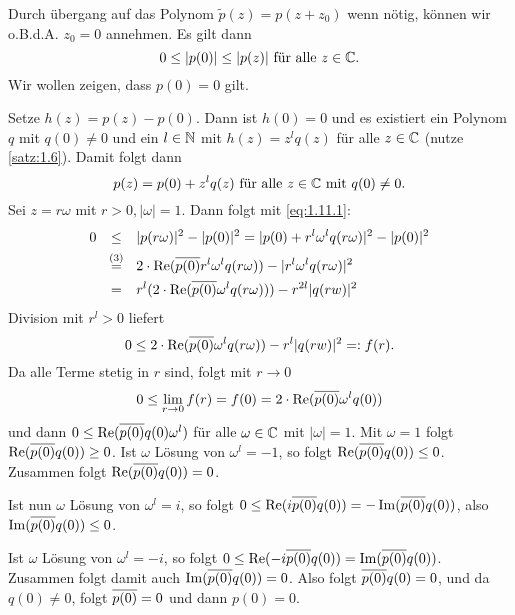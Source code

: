 \begin{beweis}
	Durch übergang auf das Polynom $\tilde{p}(z) = p(z+z_0)$ wenn nötig, können wir o.B.d.A. $z_0 = 0$ annehmen.
	Es gilt dann
	\begin{equation}
		0 \leq |p(0)| \leq |p(z)| \text{ für alle } z \in \mathbb{C}. \label{eq:1.11.1}
	\end{equation}
	Wir wollen zeigen, dass $p(0) = 0$ gilt.
	
	Setze $h(z) = p(z) - p(0)$.
	Dann ist $h(0) = 0$ und es existiert ein Polynom $q$ mit $q(0) \neq 0$ und ein $l \in \mathbb{N}$ mit $h(z) = z^{l} q(z)$ für alle $z \in \mathbb{C}$ (nutze \autoref{satz:1.6}).
	Damit folgt dann
	\[
		p(z) = p(0) + z^{l}q(z) \text{ für alle } z \in \mathbb{C} \text{ mit } q(0) \neq 0.
	\]
	Sei $z = r \omega$ mit $r > 0, |\omega| = 1$.
	Dann folgt mit \eqref{eq:1.11.1}:
	\begin{align*}
		0 &\stack{}{\leq} |p(r \omega)|^2 - |p(0)|^2 = |p(0) + r^{l}\omega^{l}q(r\omega)|^2 - |p(0)|^2 \\
		&\stack{(3)}{=} 2 \cdot \Re(\ol{p(0)} r^{l} \omega^{l} q(r\omega)) - |r^l \omega^{l} q(r\omega)|^2 \\
		&\stack{}{=} r^{l} (2\cdot \Re(\ol{p(0)} \omega^{l}q(r\omega))) - r^{2l} |q(rw)|^2
	\end{align*}
	Division mit $r^{l} > 0$ liefert
	\[
		0 \leq 2 \cdot \operatorname{Re}(\overline{p(0)}\omega^{l} q(r\omega)) - r^{l} |q(rw)|^2 =: f(r).
	\]
	Da alle Terme stetig in $r$ sind, folgt mit $r \rightarrow 0$
	\[
		0 \leq \lim\limits_{r \rightarrow 0} f(r) = f(0) = 2 \cdot \operatorname{Re}(\overline{p(0)} \omega^l q(0))
	\]
	und dann $0 \leq \operatorname{Re}(\overline{p(0)}q(0) \omega^l)$ für alle $\omega \in \mathbb{C}$ mit $|\omega| = 1$.
	Mit $\omega = 1$ folgt $\operatorname{Re}(\overline{p(0)}q(0)) \geq 0$.
	Ist $\omega$ Lösung von $\omega^l = -1$, so folgt $\operatorname{Re}(\overline{p(0)}q(0)) \leq 0$.
	Zusammen folgt $\operatorname{Re}(\overline{p(0)}q(0))=0$.
	
	Ist nun $\omega$ Lösung von $\omega^l=i$, so folgt $0 \leq \operatorname{Re}(i \overline{p(0)} q(0)) = -\operatorname{Im}(\overline{p(0)}q(0))$, also $\operatorname{Im}(\overline{p(0)}q(0)) \leq 0$.
	
	Ist $\omega$ Lösung von $\omega^l = -i$, so folgt $0 \leq \operatorname{Re}(-i \overline{p(0)} q(0)) = \operatorname{Im}(\overline{p(0)}q(0))$.
	Zusammen folgt damit auch $\operatorname{Im}(\overline{p(0)}q(0)) = 0$.
	Also folgt $\overline{p(0)}q(0)=0$, und da $q(0) \neq 0$, folgt $\overline{p(0)} = 0$ und dann $p(0) = 0$. \qedhere
\end{beweis}
\newpage